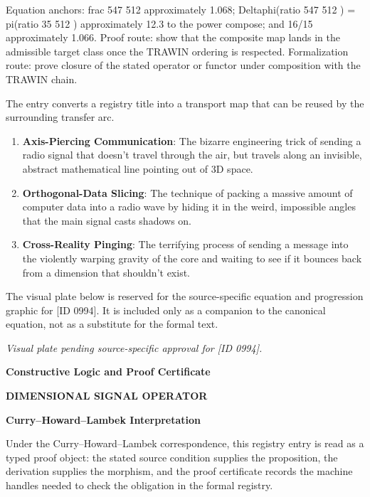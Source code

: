 Equation anchors: frac 547 512 approximately 1.068; Deltaphi(ratio 547 512 ) = pi(ratio 35 512 ) approximately 12.3 to the power compose; and 16/15 approximately 1.066. Proof route: show that the composite map lands in the admissible target class once the TRAWIN ordering is respected. Formalization route: prove closure of the stated operator or functor under composition with the TRAWIN chain.

The entry converts a registry title into a transport map that can be reused by the surrounding transfer arc.
\endgroup

\begin{enumerate}[leftmargin=1.6em,itemsep=6pt,topsep=4pt]
\item \textbf{Axis-Piercing Communication}: The bizarre engineering trick of sending a radio signal that doesn't travel through the air, but travels along an invisible, abstract mathematical line pointing out of 3D space.
\item \textbf{Orthogonal-Data Slicing}: The technique of packing a massive amount of computer data into a radio wave by hiding it in the weird, impossible angles that the main signal casts shadows on.
\item \textbf{Cross-Reality Pinging}: The terrifying process of sending a message into the violently warping gravity of the core and waiting to see if it bounces back from a dimension that shouldn't exist.
\end{enumerate}

\begingroup\footnotesize\sloppy
The visual plate below is reserved for the source-specific equation and progression graphic for [ID 0994]. It is included only as a companion to the canonical equation, not as a substitute for the formal text.
\par\endgroup
\begingroup\footnotesize\itshape
Visual plate pending source-specific approval for [ID 0994].
\par\endgroup

\clearpage
\begingroup\tzpsupportsetup
\noindent\textbf{\fontsize{10.8pt}{12.8pt}\selectfont [ID 0994] Constructive Logic and Proof Certificate}\par
\noindent\textbf{\fontsize{10pt}{12pt}\selectfont DIMENSIONAL SIGNAL OPERATOR}\par
\vspace{0.45em}
\begingroup
\footnotesize
\setlength{\parskip}{0.22em}
\setlength{\parindent}{0pt}
\noindent\textbf{Curry--Howard--Lambek Interpretation}\par
Under the Curry--Howard--Lambek correspondence, this registry entry is read as a typed proof
object: the stated source condition supplies the proposition, the derivation supplies the
morphism, and the proof certificate records the machine handles needed to check the obligation
in the formal registry.

